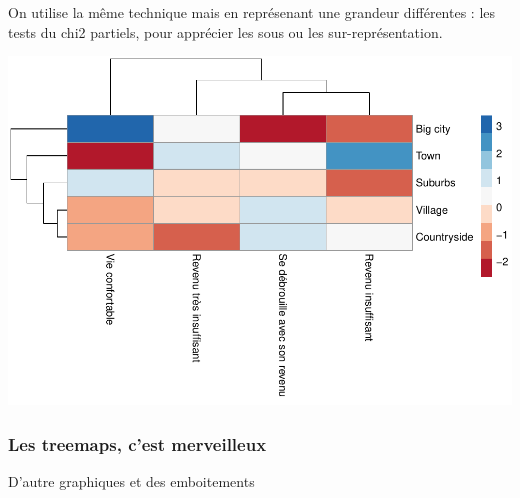 \documentclass[
]{book}
\newenvironment{Shaded}{\begin{snugshade}}{\end{snugshade}}
\newcommand{\DataTypeTok}[1]{\textcolor[rgb]{0.13,0.29,0.53}{#1}}
\newcommand{\DecValTok}[1]{\textcolor[rgb]{0.00,0.00,0.81}{#1}}
\newcommand{\KeywordTok}[1]{\textcolor[rgb]{0.13,0.29,0.53}{\textbf{#1}}}
\newcommand{\NormalTok}[1]{#1}
\newcommand{\OperatorTok}[1]{\textcolor[rgb]{0.81,0.36,0.00}{\textbf{#1}}}
\newcommand{\StringTok}[1]{\textcolor[rgb]{0.31,0.60,0.02}{#1}}
\begin{document}
On utilise la même technique mais en représenant une grandeur différentes : les tests du chi2 partiels, pour apprécier les sous ou les sur-représentation.

\begin{Shaded}
\end{Shaded}

\includegraphics{bookdown-demo_files/figure-latex/0430-1.pdf}

\hypertarget{les-treemaps-cest-merveilleux}{%
\subsubsection{Les treemaps, c'est merveilleux}\label{les-treemaps-cest-merveilleux}}

D'autre graphiques et des emboitements
\end{document}
